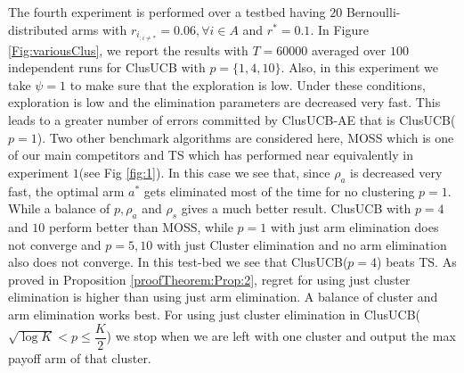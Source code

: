 	The fourth experiment is performed over a testbed having $20$ Bernoulli-distributed arms with $r_{i_{:{{i}\neq {*}}}}=0.06,\forall i\in A$ and $r^{*}=0.1$. In Figure \ref{Fig:variousClus}, we report the results with $T=60000$ averaged over $100$ independent runs for ClusUCB with  $p=\lbrace 1,4,10\rbrace$. Also, in this experiment we take $\psi = 1$ to make sure that the exploration is low. Under these conditions, exploration is low and the elimination parameters are decreased very fast. This leads to a greater number of errors committed by ClusUCB-AE that is ClusUCB($p=1$). Two other benchmark algorithms are considered here, MOSS which is one of our main competitors and TS which has performed near equivalently in experiment $1$(see Fig \ref{fig:1}). In this case we see that, since $\rho_{a}$ is decreased very fast, the optimal arm $a^{*}$ gets eliminated most of the time for no clustering $p=1$. While a balance of $p,\rho_{a}$ and $\rho_{s}$ gives a much better result. ClusUCB with $p=4$ and $10$ 
perform better than MOSS, while $p=1$ with just arm elimination does not converge and $p=5,10$ with just Cluster elimination and no arm elimination also does not converge. In this test-bed we see that ClusUCB($p=4$) beats TS. As proved in Proposition \ref{proofTheorem:Prop:2}, regret for using just cluster elimination is higher than using just arm elimination. A balance of cluster and arm elimination works best. For using just cluster elimination in ClusUCB($\sqrt{\log K}<p\leq \dfrac{K}{2}$) we stop when we are left with one cluster and output the max payoff arm of that cluster.
	
	


